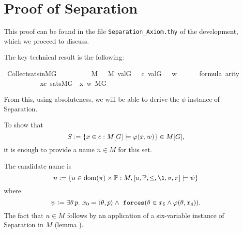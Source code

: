 \section{Proof of Separation}

This proof can be found in the file \verb|Separation_Axiom.thy| of the
development, which we proceed to discuss.

The key technical result is the following:
\begin{isabelle}
  \isamarkupfalse%
  \ Collect{\isacharunderscore}sats{\isacharunderscore}in{\isacharunderscore}MG\ {\isacharcolon}\isanewline
  \ \ \isanewline
  \ \ \ \ {\isachardoublequoteopen}{\isasympi}\ {\isasymin}\ M{\isachardoublequoteclose}\ {\isachardoublequoteopen}{\isasymsigma}\ {\isasymin}\ M{\isachardoublequoteclose}\ {\isachardoublequoteopen}val{\isacharparenleft}G{\isacharcomma}\ {\isasympi}{\isacharparenright}\ {\isacharequal}\ c{\isachardoublequoteclose}\ {\isachardoublequoteopen}val{\isacharparenleft}G{\isacharcomma}\ {\isasymsigma}{\isacharparenright}\ {\isacharequal}\ w{\isachardoublequoteclose}\isanewline
  \ \ \ \ {\isachardoublequoteopen}{\isasymphi}\ {\isasymin}\ formula{\isachardoublequoteclose}\ {\isachardoublequoteopen}arity{\isacharparenleft}{\isasymphi}{\isacharparenright}\ {\isasymle}\ {}{\isachardoublequoteclose}\isanewline
  \ \ \ \ \ \ \isanewline
  \ \ \ \ {\isachardoublequoteopen}{\isacharbraceleft}x{\isasymin}c{\isachardot}\ sats{\isacharparenleft}M{\isacharbrackleft}G{\isacharbrackright}{\isacharcomma}\ {\isasymphi}{\isacharcomma}\ {\isacharbrackleft}x{\isacharcomma}\ w{\isacharbrackright}{\isacharparenright}{\isacharbraceright}{\isasymin}\ M{\isacharbrackleft}G{\isacharbrackright}{\isachardoublequoteclose}
\end{isabelle}
%
From this, using absoluteness, we will be able to derive the
$\phi$-instance of Separation. 

To show that   
\[
S\mathrel{\mathop:}=\{x\in c : M[G]\models \varphi(x,w)\} \in M[G],
\]
it is enough to provide a name $n\in M$ for this set.
 
The candidate name is
\[
n \defi \{u \in\dom(\pi)\times\PP :M,[u,\PP,\leq,\1,\sig,\pi]\models \psi\}
\]
where
\[
\psi \defi \exists \th\, p.\ x_0=\lb\th,p\rb \y 
   \forceisa(\th\in x_5\y\phi(\th,x_4)).
\]
The fact that $n\in M$ follows by an application of a six-variable
instance of Separation in $M$ (lemma ).

